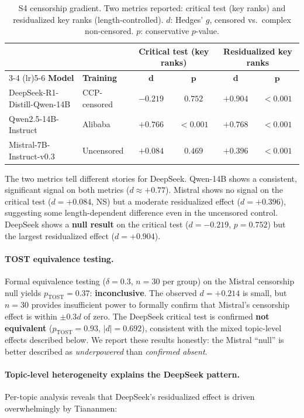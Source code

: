 \documentclass[11pt,a4paper]{article}
\begin{document}
\begin{table}[H]
\centering
\caption{S4 censorship gradient. Two metrics reported: critical test (key ranks) and residualized key ranks (length-controlled). $d$: Hedges' $g$, censored vs.\ complex non-censored. $p$: conservative $p$-value.}
\label{tab:censorship}
\begin{tabular}{llcccc}
\toprule
 & & \multicolumn{2}{c}{\textbf{Critical test (key ranks)}} & \multicolumn{2}{c}{\textbf{Residualized key ranks}} \\
\cmidrule(lr){3-4} \cmidrule(lr){5-6}
\textbf{Model} & \textbf{Training} & $\bm{d}$ & $\bm{p}$ & $\bm{d}$ & $\bm{p}$ \\
\midrule
DeepSeek-R1-Distill-Qwen-14B & CCP-censored & $-0.219$ & $0.752$ & $+0.904$ & $< 0.001$ \\
Qwen2.5-14B-Instruct & Alibaba & $+0.766$ & $< 0.001$ & $+0.768$ & $< 0.001$ \\
Mistral-7B-Instruct-v0.3 & Uncensored & $+0.084$ & $0.469$ & $+0.396$ & $< 0.001$ \\
\bottomrule
\end{tabular}
\end{table}

The two metrics tell different stories for DeepSeek. Qwen-14B shows a consistent, significant signal on both metrics ($d \approx +0.77$). Mistral shows no signal on the critical test ($d = +0.084$, NS) but a moderate residualized effect ($d = +0.396$), suggesting some length-dependent difference even in the uncensored control. DeepSeek shows a \textbf{null result} on the critical test ($d = -0.219$, $p = 0.752$) but the largest residualized effect ($d = +0.904$).

\paragraph{TOST equivalence testing.} Formal equivalence testing ($\delta = 0.3$, $n = 30$ per group) on the Mistral censorship null yields $p_{\text{TOST}} = 0.37$: \textbf{inconclusive}. The observed $d = +0.214$ is small, but $n = 30$ provides insufficient power to formally confirm that Mistral's censorship effect is within $\pm 0.3d$ of zero. The DeepSeek critical test is confirmed \textbf{not equivalent} ($p_{\text{TOST}} = 0.93$, $|d| = 0.692$), consistent with the mixed topic-level effects described below. We report these results honestly: the Mistral ``null'' is better described as \emph{underpowered} than \emph{confirmed absent}.

\paragraph{Topic-level heterogeneity explains the DeepSeek pattern.} Per-topic analysis reveals that DeepSeek's residualized effect is driven overwhelmingly by Tiananmen:
\end{document}

